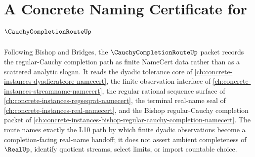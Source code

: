 \chapter{A Concrete Naming Certificate for $\CauchyCompletionRouteUp$}
\label{ch:concrete-instances-cauchy-completion-route-namecert}

Following Bishop and Bridges, the $\CauchyCompletionRouteUp$ packet records the regular-Cauchy completion path as finite NameCert data rather than as a scattered analytic slogan. It reads the dyadic tolerance core of \autoref{ch:concrete-instances-dyadicratcore-namecert}, the finite observation interface of \autoref{ch:concrete-instances-streamname-namecert}, the regular rational sequence surface of \autoref{ch:concrete-instances-regseqrat-namecert}, the terminal real-name seal of \autoref{ch:concrete-instances-real-namecert}, and the Bishop regular-Cauchy completion packet of \autoref{ch:concrete-instances-bishop-regular-cauchy-completion-namecert}. The route names exactly the L10 path by which finite dyadic observations become a completion-facing real-name handoff; it does not assert ambient completeness of $\RealUp$, identify quotient streams, select limits, or import countable choice.

